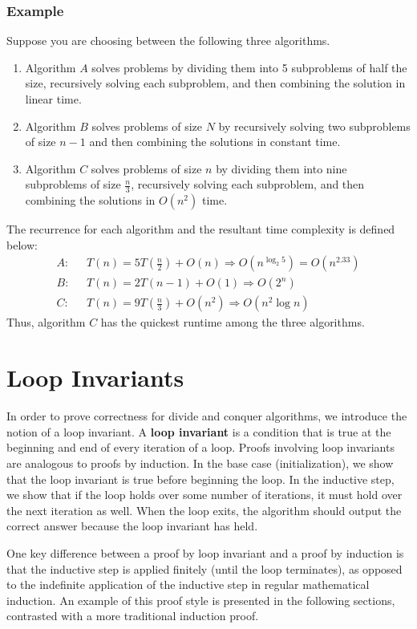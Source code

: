 \documentclass[11pt]{article}
\begin{document}
\subsubsection{Example}
Suppose you are choosing between the following three algorithms.
\begin{enumerate}
    \item Algorithm $A$ solves problems by dividing them into 5 subproblems of half the size, recursively solving each subproblem, and then combining the solution in linear time.
    \item Algorithm $B$ solves problems of size $N$ by recursively solving two subproblems of size $n - 1$ and then combining the solutions in constant time. 
    \item Algorithm $C$ solves problems of size $n$ by dividing them into nine subproblems of size $\frac{n}{3}$, recursively solving each subproblem, and then combining the solutions in $O(n^2)$ time. 
\end{enumerate}
The recurrence for each algorithm and the resultant time complexity is defined below:
\begin{align*}
    A: \text{ } & T(n) = 5T\left(\frac{n}{2}\right) + O(n) \Longrightarrow O(n^{\log_2 5}) = O(n^{2.33})\\
    B: \text{ } & T(n) = 2T(n - 1) + O(1) \Longrightarrow O(2^n) \\
    C: \text{ } & T(n) = 9T\left(\frac{n}{3}\right) + O(n^2) \Longrightarrow O(n^2\log n) 
\end{align*}
Thus, algorithm $C$ has the quickest runtime among the three algorithms.

\section{Loop Invariants}
In order to prove correctness for divide and conquer algorithms, we introduce the notion of a loop invariant. A \textbf{loop invariant} is a condition that is true at the beginning and end of every iteration of a loop. Proofs involving loop invariants are analogous to proofs by induction. In the base case (initialization), we show that the loop invariant is true before beginning the loop. In the inductive step, we show that if the loop holds over some number of iterations, it must hold over the next iteration as well. When the loop exits, the algorithm should output the correct answer because the loop invariant has held. 

One key difference between a proof by loop invariant and a proof by induction is that the inductive step is applied finitely (until the loop terminates), as opposed to the indefinite application of the inductive step in regular mathematical induction. An example of this proof style is presented in the following sections, contrasted with a more traditional induction proof. 
\end{document}
